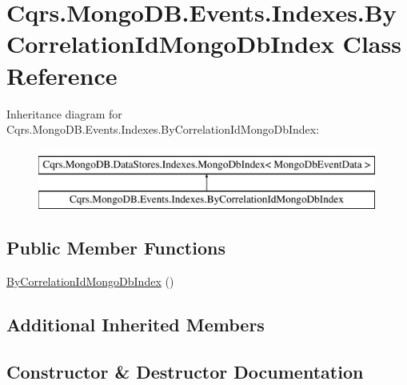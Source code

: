 \hypertarget{classCqrs_1_1MongoDB_1_1Events_1_1Indexes_1_1ByCorrelationIdMongoDbIndex}{}\section{Cqrs.\+Mongo\+D\+B.\+Events.\+Indexes.\+By\+Correlation\+Id\+Mongo\+Db\+Index Class Reference}
\label{classCqrs_1_1MongoDB_1_1Events_1_1Indexes_1_1ByCorrelationIdMongoDbIndex}
Inheritance diagram for Cqrs.\+Mongo\+D\+B.\+Events.\+Indexes.\+By\+Correlation\+Id\+Mongo\+Db\+Index\+:\begin{figure}[H]
\begin{center}
\leavevmode
\includegraphics[height=2.000000cm]{classCqrs_1_1MongoDB_1_1Events_1_1Indexes_1_1ByCorrelationIdMongoDbIndex}
\end{center}
\end{figure}
\subsection*{Public Member Functions}
\begin{DoxyCompactItemize}
\item 
\hyperlink{classCqrs_1_1MongoDB_1_1Events_1_1Indexes_1_1ByCorrelationIdMongoDbIndex_a7bfea0225205a97ffd3501ba5032b5b3}{By\+Correlation\+Id\+Mongo\+Db\+Index} ()
\end{DoxyCompactItemize}
\subsection*{Additional Inherited Members}


\subsection{Constructor \& Destructor Documentation}
\mbox{\label{classCqrs_1_1MongoDB_1_1Events_1_1Indexes_1_1ByCorrelationIdMongoDbIndex_a7bfea0225205a97ffd3501ba5032b5b3}} 
